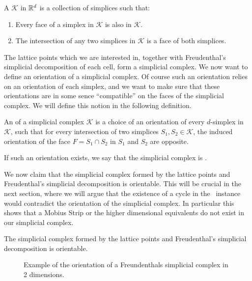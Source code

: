 \begin{definition}
	A  $\mathcal{K}$ in $\mathbb{R}^d$ is a collection of simplices such that:
	\begin{enumerate}
		\item Every face of a simplex in $\mathcal{K}$ is also in $\mathcal{K}$.
		\item The intersection of any two simplices in $\mathcal{K}$ is a face of both simplices.
	\end{enumerate}
\end{definition}

The lattice points which we are interested in, together with Freudenthal's simplicial decomposition of each cell, form a simplicial complex. We now want to define an orientation of a simplicial complex. Of course such an orientation relies on an orientation of each simplex, and we want to make sure that these orientations are in some sence ``compatible'' on the faces of the simplicial complex. We will define this notion in the following definition.

\begin{definition}
	An  of a simplicial complex $\mathcal{K}$ is a choice of an orientation of every $d$-simplex in $\mathcal{K}$, such that for every intersection of two simplices $S_1, S_2 \in \mathcal{K}$, the induced orientation of the face $F = S_1 \cap S_2$ in $S_1$ and $S_2$ are opposite. \par
	If such an orientation exists, we say that the simplicial complex is .
\end{definition}

We now claim that the simplicial complex formed by the lattice points and Freudenthal's simplicial decomposition is orientable. This will be crucial in the next section, where we will argue that the existence of a cycle in the \EndOfLine\ instance would contradict the orientation of the simplicial complex. In particular this shows that a Mobius Strip or the higher dimensional equivalents do not exist in our simplicial complex.

\begin{claim}
	The simplicial complex formed by the lattice points and Freudenthal's simplicial decomposition is orientable.
\end{claim}

\begin{figure}[ht]
	\centering
	\caption[Orientation of a simplicial complex]{Example of the orientation of a Freundenthals simplicial complex in 2 dimensions.}
	\label{fig:orientation_of_simplicial_complex}
\end{figure}

